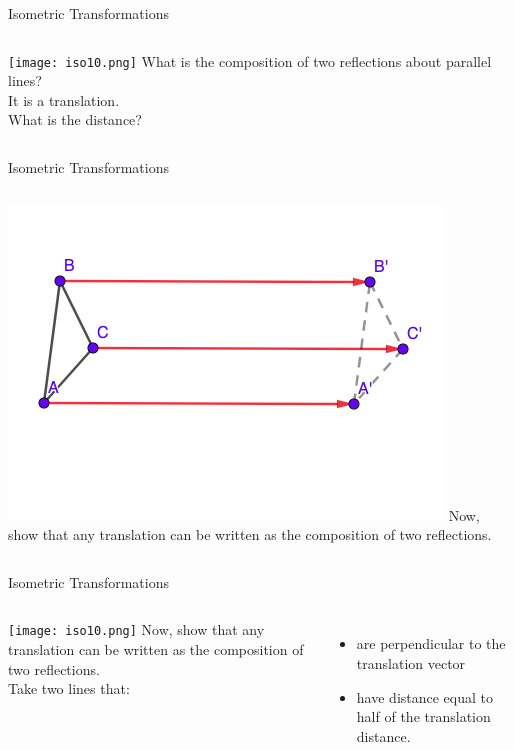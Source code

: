 \documentclass{beamer}
\begin{document}
\begin{frame}{Isometric Transformations}
	\begin{columns}
		\texttt{[image: iso10.png]}
		What is the composition of two reflections about parallel
		lines?\\
		\phantom{Spacing}
		It is a translation.\\
		\phantom{Spacing}
		What is the distance?
	\end{columns}
\end{frame}
\begin{frame}{Isometric Transformations}
	\begin{columns}
		\column{0.6\textwidth}
		\includegraphics[scale=0.4]{iso11.png}
		\column{0.4\textwidth}
		Now, show that any translation can be written as the
		composition of two reflections.
	\end{columns}
\end{frame}
\begin{frame}{Isometric Transformations}
	\begin{columns}
		\texttt{[image: iso10.png]}
		Now, show that any translation can be written as the
		composition of two reflections.\\
		Take two lines that:
		\begin{itemize}
			\item are perpendicular to the translation vector
			\item have distance equal to half of the translation
				distance.
		\end{itemize}
	\end{columns}
\end{frame}
\end{document}
